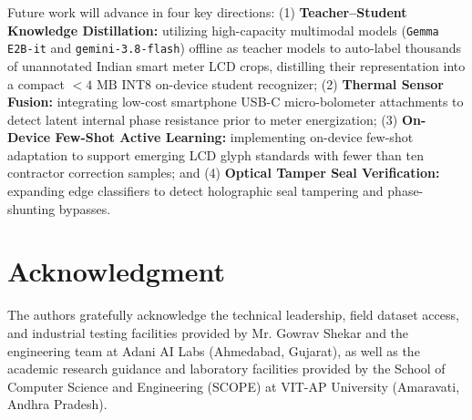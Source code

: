 \documentclass[conference]{IEEEtran}
\begin{document}
Future work will advance in four key directions:
(1) \textbf{Teacher--Student Knowledge Distillation:} utilizing high-capacity multimodal models (\texttt{Gemma E2B-it} and \texttt{gemini-3.8-flash}) offline as teacher models to auto-label thousands of unannotated Indian smart meter LCD crops, distilling their representation into a compact ${<}4\text{~MB}$ INT8 on-device student recognizer;
(2) \textbf{Thermal Sensor Fusion:} integrating low-cost smartphone USB-C micro-bolometer attachments to detect latent internal phase resistance prior to meter energization;
(3) \textbf{On-Device Few-Shot Active Learning:} implementing on-device few-shot adaptation to support emerging LCD glyph standards with fewer than ten contractor correction samples; and
(4) \textbf{Optical Tamper Seal Verification:} expanding edge classifiers to detect holographic seal tampering and phase-shunting bypasses.

\section*{Acknowledgment}
The authors gratefully acknowledge the technical leadership, field dataset access, and industrial testing facilities provided by Mr. Gowrav Shekar and the engineering team at Adani AI Labs (Ahmedabad, Gujarat), as well as the academic research guidance and laboratory facilities provided by the School of Computer Science and Engineering (SCOPE) at VIT-AP University (Amaravati, Andhra Pradesh).



\end{document}

